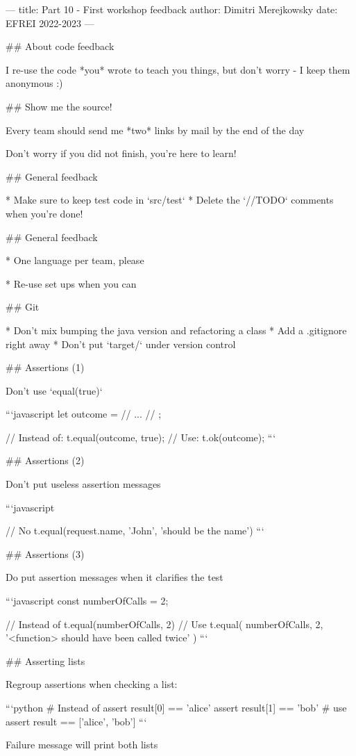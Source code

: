 ---
title: Part 10 - First workshop feedback
author: Dimitri Merejkowsky
date: EFREI 2022-2023
---

## About code feedback

I re-use the code *you* wrote to teach you things, but
don't worry - I keep them anonymous :)

## Show me the source!

Every team should send me *two* links by mail by the end of the day

\vfill

Don't worry if you did not finish, you're here to learn!

## General feedback

* Make sure to keep test code in `src/test`
* Delete the `//TODO` comments when you're done!

## General feedback

* One language per team, please

* Re-use set ups when you can


## Git

* Don't mix bumping the java version and refactoring a class
* Add a .gitignore right away
* Don't put `target/` under version control


## Assertions (1)

Don't use `equal(true)`

```javascript
let outcome = //  ... // ;

// Instead of:
t.equal(outcome, true);
// Use:
t.ok(outcome);
```

## Assertions (2)

Don't put useless assertion messages

```javascript

// No
t.equal(request.name, 'John', 'should be the name')
```

## Assertions (3)

Do put assertion messages when it clarifies the test

```javascript
const numberOfCalls = 2;

// Instead of
t.equal(numberOfCalls, 2)
// Use
t.equal(
  numberOfCalls,
  2,
  '<function> should have been called twice'
)
```

## Asserting lists

Regroup assertions when checking a list:

```python
# Instead of
assert result[0] == 'alice'
assert result[1] == 'bob'
# use
assert result == ['alice', 'bob']
```

Failure message will print both lists

